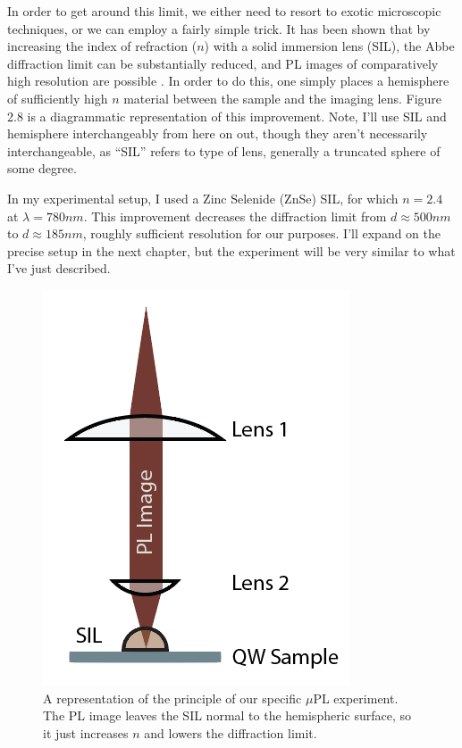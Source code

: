 \indent In order to get around this limit, we either need to resort to exotic microscopic techniques, or we can employ a fairly simple trick. It has been shown that by increasing the index of refraction ($n$) with a solid immersion lens (SIL), the Abbe diffraction limit can be substantially reduced, and PL images of comparatively high resolution are possible  \cite{yoshitaapp}. In order to do this, one simply places a hemisphere of sufficiently high $n$ material between the sample and the imaging lens. Figure 2.8 is a diagrammatic representation of this improvement. Note, I'll use SIL and hemisphere interchangeably from here on out, though they aren't necessarily interchangeable, as ``SIL'' refers to type of lens, generally a truncated sphere of some degree. 

\indent In my experimental setup, I used a Zinc Selenide (ZnSe) SIL, for which $n = 2.4$ at $\lambda = 780 nm$. This improvement decreases the diffraction limit from $d \approx 500nm$ to $ d \approx 185 nm$, roughly sufficient resolution for our purposes. I'll expand on the precise setup in the next chapter, but the experiment will be very similar to what I've just described.
\begin{figure}[h!]
\label{confocal2}
\centering
\includegraphics[width = .3\textwidth]{confocal2.png}
\caption{\doublespacing A representation of the principle of our specific $\mu$PL experiment. The PL image leaves the SIL normal to the hemispheric surface, so it just increases $n$ and lowers the diffraction limit.}
\end{figure}

\newpage
